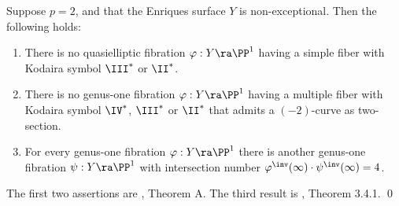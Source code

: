 \begin{proposition}
\notready
\label{properties non-exceptional}
Suppose $p=2$, and that the Enriques surface $Y$ is non-except\-ional. Then the following holds:
\begin{enumerate}
\item
There is no quasielliptic fibration $\varphi:Y\ra\PP^1$ having a simple fiber
with Kodaira symbol $\III^*$ or $\II^*$.
\item
There is no genus-one fibration $\varphi:Y\ra\PP^1$ having a multiple fiber   with Kodaira symbol
$\IV^*$, $\III^*$ or $\II^*$ that admits a $(-2)$-curve   as two-section.
\item
For every genus-one fibration $\varphi:Y\ra\PP^1$ there is another genus-one fibration $\psi:Y\ra\PP^1$
with intersection number $\varphi^\inv(\infty)\cdot \psi^\inv(\infty)=4$.
\end{enumerate}
\end{proposition}

\proof
The first two assertions  are \cite{Ekedahl-Shepherd-Barron-2004}, Theorem A.
The third result is \cite{Cossec-Dolgachev-1989}, Theorem 3.4.1.
\qed


